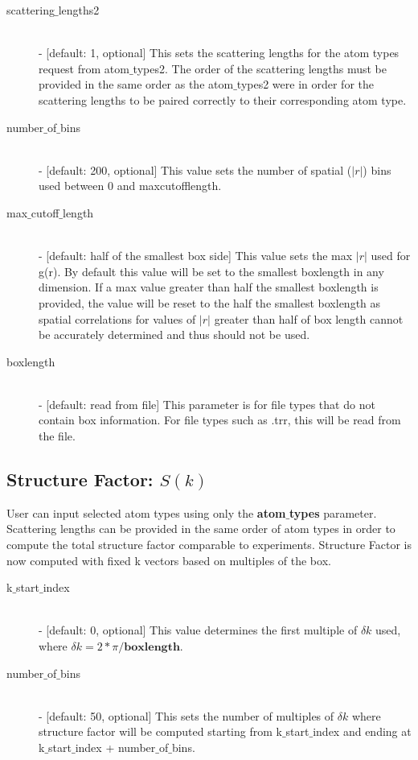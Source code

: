 \documentclass{article}
\begin{document}
\begin{description}
	\item[scattering$\_$lengths2] \hfill \\
	- [default: 1, optional] This sets the scattering lengths for the atom types request from atom$\_$types2.  The order of the scattering lengths must be provided in the same order as the atom$\_$types2 were in order for the scattering lengths to be paired correctly to their corresponding atom type. 
	
	\item[number$\_$of$\_$bins] \hfill \\
	- [default: 200, optional] This value sets the number of spatial ($|r|$) bins used between 0 and maxcutofflength.
	
	\item[max$\_$cutoff$\_$length] \hfill \\
	- [default: half of the smallest box side] This value sets the max $|r|$ used for g(r).  By default this value will be set to the smallest boxlength in any dimension.  If a max value greater than half the smallest boxlength is provided, the value will be reset to the half the smallest boxlength as spatial correlations for values of $|r|$ greater than half of box length cannot be accurately determined and thus should not be used.
	
	\item[boxlength] \hfill \\
	- [default: read from file] This parameter is for file types that do not contain box information. For file types such as .trr, this will be read from the file. 
	
\end{description}


\subsection{Structure Factor: $S(k)$} \label{sec::sofk_parm}
User can input selected atom types using only the \textbf{atom$\_$types} parameter.  Scattering lengths can be provided in the same order of atom types in order to compute the total structure factor comparable to experiments. Structure Factor is now computed with fixed k vectors based on multiples of the box.
\begin{description}		
	\item[k$\_$start$\_$index] \hfill \\
	- [default: 0, optional] This value determines the first multiple of $\delta k$ used, where $\delta k = 2*\pi/\textbf{boxlength}$.  
		
	\item[number$\_$of$\_$bins] \hfill \\
	- [default: 50, optional] This sets the number of multiples of $\delta k$ where structure factor will be computed starting from k$\_$start$\_$index and ending at k$\_$start$\_$index + number$\_$of$\_$bins.  

\end{description}
\end{document}
